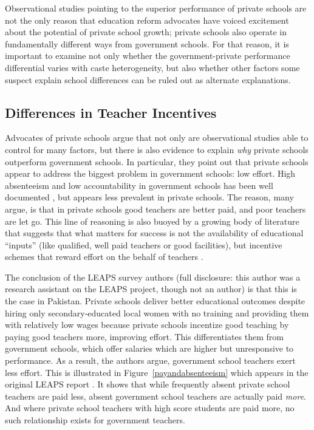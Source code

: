 \documentclass[Eubank_pk_ethnic_sorting.tex]{subfiles}
\begin{document}
Observational studies pointing to the superior performance of private schools are not the only reason that education reform advocates have voiced excitement about the potential of private school growth; private schools also operate in fundamentally different ways from government schools. For that reason, it is important to examine not only whether the government-private performance differential varies with caste heterogeneity, but also whether other factors some suspect explain school differences can be ruled out as alternate explanations.


\subsection{Differences in Teacher Incentives}\label{incentives}

Advocates of private schools argue that not only are observational studies able to control for many factors, but there is also evidence to explain \emph{why} private schools outperform government schools. In particular, they point out that private schools appear to address the biggest problem in government schools: low effort. High absenteeism and low accountability in government schools has been well documented \citep{Muralidharan:2008tb, Chaudhury:2006vp}, but appears less prevalent in private schools. The reason, many argue, is that in private schools good teachers are better paid, and poor teachers are let go. This line of reasoning is also buoyed by a growing body of literature that suggests that what matters for success is not the availability of educational ``inputs'' (like qualified, well paid teachers or good facilities), but incentive schemes that reward effort on the behalf of teachers \citep{Hanushek:1997tt,Hanushek:2003hz,Banerjee:2007wx}.

The conclusion of the LEAPS survey authors (full disclosure: this author was a research assistant on the LEAPS project, though not an author) is that this is the case in Pakistan. Private schools deliver better educational outcomes despite hiring only secondary-educated local women with no training and providing them with relatively low wages because private schools incentize good teaching by paying good teachers more, improving effort. This differentiates them from government schools, which offer salaries which are higher but unresponsive to performance. As a result, the authors argue, government school teachers exert less effort. This is illustrated in Figure~\ref{payandabsenteeism} which appears in the original LEAPS report \citep{Andrabi:2007we}. It shows that while frequently absent private school teachers are paid less, absent government school teachers are actually paid \emph{more}. And where private school teachers with high score students are paid more, no such relationship exists for government teachers.
\end{document}

